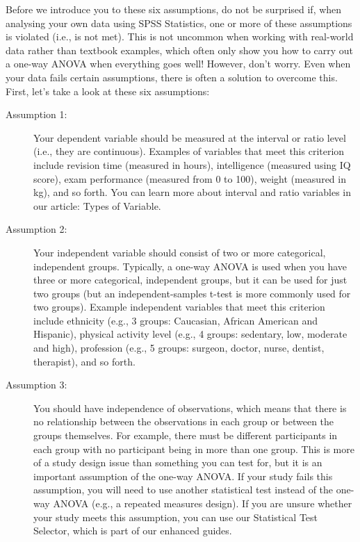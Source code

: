 \documentclass[]{article}
\begin{document}
Before we introduce you to these six assumptions, do not be surprised if, when analysing your own data using SPSS Statistics, one or more of these assumptions is violated (i.e., is not met). This is not uncommon when working with real-world data rather than textbook examples, which often only show you how to carry out a one-way ANOVA when everything goes well! However, don’t worry. Even when your data fails certain assumptions, there is often a solution to overcome this. First, let’s take a look at these six assumptions:

\begin{description}
\item[Assumption 1:] Your dependent variable should be measured at the interval or ratio level (i.e., they are continuous). Examples of variables that meet this criterion include revision time (measured in hours), intelligence (measured using IQ score), exam performance (measured from 0 to 100), weight (measured in kg), and so forth. You can learn more about interval and ratio variables in our article: Types of Variable.
\item[Assumption 2:] Your independent variable should consist of two or more categorical, independent groups. Typically, a one-way ANOVA is used when you have three or more categorical, independent groups, but it can be used for just two groups (but an independent-samples t-test is more commonly used for two groups). Example independent variables that meet this criterion include ethnicity (e.g., 3 groups: Caucasian, African American and Hispanic), physical activity level (e.g., 4 groups: sedentary, low, moderate and high), profession (e.g., 5 groups: surgeon, doctor, nurse, dentist, therapist), and so forth.
\item[Assumption 3:] You should have independence of observations, which means that there is no relationship between the observations in each group or between the groups themselves. For example, there must be different participants in each group with no participant being in more than one group. This is more of a study design issue than something you can test for, but it is an important assumption of the one-way ANOVA. If your study fails this assumption, you will need to use another statistical test instead of the one-way ANOVA (e.g., a repeated measures design). If you are unsure whether your study meets this assumption, you can use our Statistical Test Selector, which is part of our enhanced guides.

\end{description}
\end{document}
